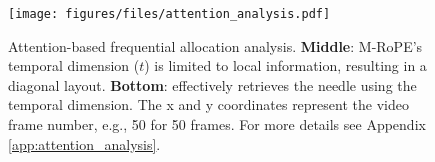 \begin{figure}[t]
\centering
\texttt{[image: figures/files/attention\_analysis.pdf]}
\vspace{-6pt}
\caption{\footnotesize Attention-based frequential allocation analysis.
\textbf{Middle}: M-RoPE's temporal dimension ($t$) is limited to local information, resulting in a diagonal layout.
\textbf{Bottom}: \methodname effectively retrieves the needle using the temporal dimension.
The x and y coordinates represent the video frame number, e.g., 50 for 50 frames.
For more details see Appendix \ref{app:attention_analysis}.
}
\vspace{-12pt}
\label{fig:attention_analysis}
\end{figure}

